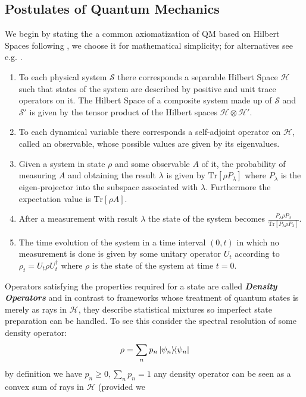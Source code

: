 \subsection{Postulates of Quantum Mechanics}
We begin by stating the a common axiomatization of QM based on Hilbert Spaces following \cite{ballentine_quantum_2014}, we choose it for mathematical simplicity; for alternatives see e.g. \cite{reyes-lega_aspects_2015}.
\begin{enumerate}
        \item To each physical system $\mathcal{S}$ there corresponds a separable Hilbert Space $\mathcal{H}$ such that states of the system are described by positive and unit trace operators on it. The Hilbert Space of a composite system made up of $\mathcal{S}$ and $\mathcal{S}'$
        is given by the tensor product of the Hilbert spaces $\mathcal{H}\otimes\mathcal{H}'$.
        \item To each dynamical variable there corresponds a self-adjoint operator on $\mathcal{H}$, called an observable, whose possible
        values are given by its eigenvalues.
        \item Given a system in  state $\rho$ and some observable $A$ of it, the probability of measuring $A$ and obtaining the result
        $\lambda$ is given by $\mathrm{Tr}[\rho P_{\lambda}]$ where $P_{\lambda}$ is the eigen-projector into the subspace associated with
        $\lambda$. Furthermore the expectation value is $\mathrm{Tr}[\rho A]$.
        \item After a measurement with result $\lambda$ the state of the system becomes $\frac{P_{\lambda}\rho P_{\lambda}}{\mathrm{Tr}[P_{\lambda}\rho
        P_{\lambda}]}$.
        \item The time evolution of the system in a time interval $(0,t)$ in which no measurement is done is given by some unitary operator
        $U_{t}$ according to $\rho_{t}=U_{t}\rho U_{t}^{\dagger}$ where $\rho$ is the state of the system at time $t=0$.
\end{enumerate}
Operators satisfying the properties required for a state are called \textit{\textbf{Density Operators}} and in contrast to frameworks
whose treatment of quantum states is merely as rays in $\mathcal{H}$, they describe statistical mixtures so imperfect state preparation
can be handled. To see this consider the spectral resolution of some density operator:
\begin{equation}
  \rho = \sum_{n}p_{n}\ketbra{\psi_{n}}
\end{equation}
by definition we have $p_{n}\geq 0, \sum_{n}p_{n}=1$  any density operator can be seen as a convex sum of rays in $\mathcal{H}$ (provided we
